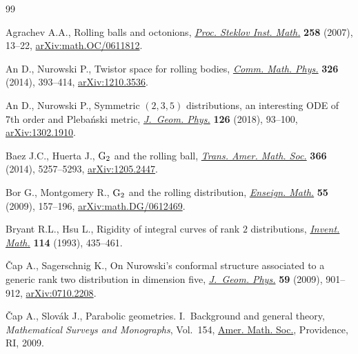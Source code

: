 \documentclass[10pt,a4paper]{amsart}
\numberwithin{equation}{section}
\begin{document}
\newpage
{}

\begin{thebibliography}{99}
\footnotesize\itemsep=0pt

Agrachev A.A., Rolling balls and octonions, \href{https://doi.org/10.1134/S0081543807030030}{\textit{Proc. Steklov Inst. Math.}}
 \textbf{258} (2007), 13--22, \href{https://arxiv.org/abs/math.OC/0611812}{arXiv:math.OC/0611812}.

An D., Nurowski P., Twistor space for rolling bodies, \href{https://doi.org/10.1007/s00220-013-1839-2}{\textit{Comm. Math.
 Phys.}} \textbf{326} (2014), 393--414, \href{https://arxiv.org/abs/1210.3536}{arXiv:1210.3536}.

An D., Nurowski P., Symmetric {$(2,3,5)$} distributions, an interesting {ODE}
 of 7th order and {P}leba\'{n}ski metric, \href{https://doi.org/10.1016/j.geomphys.2018.01.009}{\textit{J.~Geom. Phys.}} \textbf{126}
 (2018), 93--100, \href{https://arxiv.org/abs/1302.1910}{arXiv:1302.1910}.

Baez J.C., Huerta J., {${\rm G}_2$} and the rolling ball, \href{https://doi.org/10.1090/S0002-9947-2014-05977-1}{\textit{Trans. Amer.
 Math. Soc.}} \textbf{366} (2014), 5257--5293, \href{https://arxiv.org/abs/1205.2447}{arXiv:1205.2447}.

Bor G., Montgomery R., {${\rm G}_2$} and the rolling distribution,
 \href{https://doi.org/10.4171/LEM/55-1-8}{\textit{Enseign. Math.}} \textbf{55} (2009), 157--196,
 \href{https://arxiv.org/abs/math.DG/0612469}{arXiv:math.DG/0612469}.

Bryant R.L., Hsu L., Rigidity of integral curves of rank {$2$} distributions,
 \href{https://doi.org/10.1007/BF01232676}{\textit{Invent. Math.}} \textbf{114} (1993), 435--461.

\v{C}ap A., Sagerschnig K., On {N}urowski's conformal structure associated to a
 generic rank two distribution in dimension five, \href{https://doi.org/10.1016/j.geomphys.2009.04.001}{\textit{J.~Geom. Phys.}}
 \textbf{59} (2009), 901--912, \href{https://arxiv.org/abs/0710.2208}{arXiv:0710.2208}.

\v{C}ap A., Slov\'{a}k J., Parabolic geometries. {I}.~{B}ackground and general
 theory, \textit{Mathematical Surveys and Monographs}, Vol.~154, \href{https://doi.org/10.1090/surv/154}{Amer. Math.
 Soc.}, Providence, RI, 2009.


\end{thebibliography}
\end{document}
